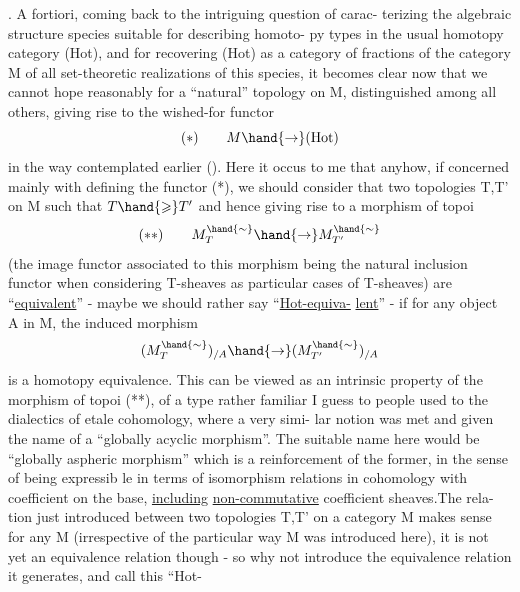 .  A fortiori,  coming back to the intriguing question of  carac-%
terizing the algebraic structure species suitable for describing homoto-%
py types in the usual homotopy category (Hot),   and for
recovering (Hot) as a category of fractions of the category M of all
set-theoretic realizations of this species,  it becomes clear now that
we cannot hope reasonably for a ``natural'' topology on M,  distinguished
among all others,  giving rise to the wished-for functor
\[ (*) \qquad M \hand{\to} (\mathrm{Hot}) \]
in the way contemplated earlier ().  Here it occus to me
that anyhow,  if concerned mainly with defining the functor (*),  we
should consider that two topologies T,T' on M such that $T \hand{\geqslant} T'$  and
hence giving rise to a morphism of topoi
\[ (**) \qquad M_T^{\hand{\sim}} \hand{\to} M_{T'}^{\hand{\sim}} \]
(the  image functor associated to this morphism being the natural
inclusion functor\hand{,} when considering T-sheaves as particular cases of
T-sheaves) are ``\uline{equivalent}''  -  maybe we should rather say ``\uline{Hot-equiva-}%
\uline{lent}'' -  if for any  object A in M,  the induced morphism
\[ (M_T^{\hand{\sim}})_{/A} \hand{\to} (M_{T'}^{\hand{\sim}})_{/A} \]
is a homotopy equivalence.  This can be viewed as an intrinsic property
of the morphism of topoi (**), of a type rather familiar I guess to
people used to the dialectics of \hand{\'{}}etale cohomology,  where a very simi-%
lar notion was met and given the name of a ``globally acyclic morphism''.
The suitable name here would be ``globally aspheric morphism''
which is a reinforcement of the former,  in the sense of being expressib%
le in terms of isomorphism relations in cohomology with  coefficient 
on the base,  \uline{including} \uline{non-commutative} coefficient sheaves.The rela-%
tion just introduced between two topologies T,T' on a category M makes
sense for any M  (irrespective of the particular way M was introduced
here),  it is not yet an equivalence relation though  -  so why not
introduce the equivalence relation it generates,  and call this ``Hot-%
